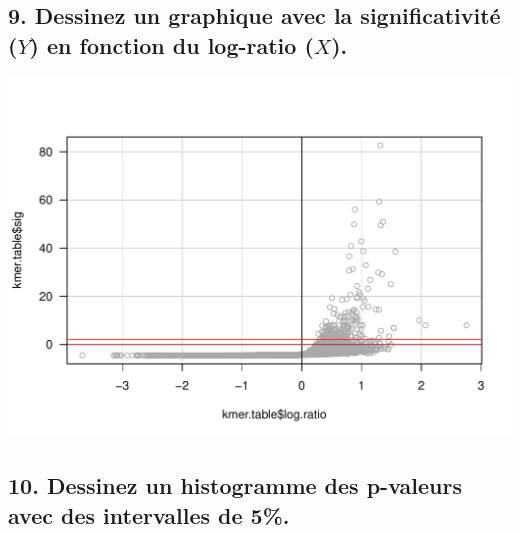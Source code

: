 \documentclass[]{article}
\newenvironment{Shaded}{\begin{snugshade}}{\end{snugshade}}
\newcommand{\KeywordTok}[1]{\textcolor[rgb]{0.94,0.87,0.69}{#1}}
\newcommand{\DataTypeTok}[1]{\textcolor[rgb]{0.87,0.87,0.75}{#1}}
\newcommand{\DecValTok}[1]{\textcolor[rgb]{0.86,0.86,0.80}{#1}}
\newcommand{\StringTok}[1]{\textcolor[rgb]{0.80,0.58,0.58}{#1}}
\newcommand{\OperatorTok}[1]{\textcolor[rgb]{0.94,0.94,0.82}{#1}}
\newcommand{\NormalTok}[1]{\textcolor[rgb]{0.80,0.80,0.80}{#1}}
\begin{document}
\subsection{\texorpdfstring{9. Dessinez un graphique avec la
significativité (\(Y\)) en fonction du log-ratio
(\(X\)).}{9. Dessinez un graphique avec la significativité (Y) en fonction du log-ratio (X).}}\label{dessinez-un-graphique-avec-la-significativite-y-en-fonction-du-log-ratio-x.}

\begin{Shaded}
\end{Shaded}

\begin{center}\includegraphics{figures/multiple_tests_practical_unnamed-chunk-10-1} \end{center}

\subsection{10. Dessinez un histogramme des p-valeurs avec des
intervalles de
5\%.}\label{dessinez-un-histogramme-des-p-valeurs-avec-des-intervalles-de-5.}
\end{document}
